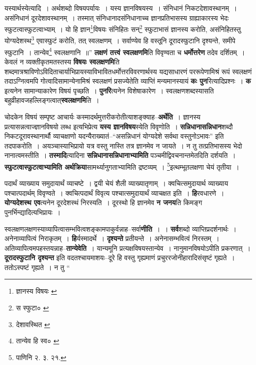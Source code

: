 \documentclass[article,12pt,a4paper]{memoir}
\begin{document}
	यस्यार्थस्येत्यादि । अर्थशब्दो विषयपर्यायः । यस्य ज्ञानविषयस्य । संनिधानं निकटदेशावस्थानम् । असंनिधानं दूरदेशावस्थानम् । तस्मात् संनिधानादसंनिधानाच्च ज्ञानप्रतिभासस्य ग्राह्याकारस्य भेदः स्फुटत्वास्फुटत्वाभ्याम् । यो हि ज्ञान\footnote{ज्ञानस्य विषयः \cite{dp-msA} \cite{dp-edP} \cite{dp-edH} \cite{dp-edE} \cite{dp-edN}}विषयः संनिहितः सन्\footnote{स स्फुटा० \cite{dp-msB} \cite{dp-msC} \cite{dp-msD}} स्फुटाभासं ज्ञानस्य करोति, असंनिहितस्तु योग्यदेशस्थ\footnote{देशावस्थित \cite{dp-msA} \cite{dp-msB} \cite{dp-msC} \cite{dp-edP} \cite{dp-edH} \cite{dp-edE} \cite{dp-edN}} एवास्फुटं करोति, तत् स्वलक्षणम् । सर्वाण्येव हि वस्तूनि दूरादस्फुटानि दृश्यन्ते, समीपे स्फुटानि । तान्येव\footnote{तान्येव हि स्व० \cite{dp-msC}} स्वलक्षणानि ॥” \textbf{लक्षणं तत्त्वं स्वलक्षणमि}ति विवृण्वता च \textbf{धर्मोत्तरेण} तदेव दर्शितम् । केवलं न व्यक्तीकृतमतस्तस्य \textbf{विषयः स्वलक्षणमि}ति शब्दमात्रश्राविणोऽविदिताचार्याभिप्रायस्याविभावितधर्मोत्तरविवरणार्थस्य यद्यसाधारणं पररूपेणामिश्रं रूपं स्वलक्षणं तदाऽग्नित्वमपि गोत्वादिसामान्येनामिश्रं स्वलक्षणं प्रसज्येतेति व्याप्तिं मन्यमानस्यायं \textbf{कः पुन}रित्यादिप्रश्नः । \textbf{क} इत्यनेन सामान्याकारेण विषयं पृच्छति । \textbf{पुनरि}त्यनेन विशेषाकारेण । स्वलक्षणशब्दस्यासति बहुव्रीहावजहल्लिङ्गत्वात्\textbf{स्वलक्षणमि}ति ।
	\pend
      

	  \pstart चोदकेन विषयं सम्पृष्ट आचार्यः कस्मादर्थमुत्तरीकरोतीत्याशङ्क्याह--\textbf{अर्थेति} । ज्ञानस्य प्रत्यासन्नत्वाज्ज्ञानविषयो लब्ध इत्यभिप्रेत्य \textbf{यस्य ज्ञानविषय}स्येति विवृणोति । \textbf{सन्निधानासन्निधान}शब्दौ निकटदूरावस्थानार्थौ व्याचक्षाणो यदन्यैराख्यातं--“असन्निधानं योग्यदेशे सर्वथा वस्तुनोऽभावः” इति तदपाकरोति । अयञ्चास्याभिप्रायो यत्र वस्तु नास्ति तत्र ज्ञानमेव न जायते । न तु तत्प्रतिभासस्य भेदो नानात्वमस्तीति । \textbf{तस्मादि}त्यादिना \textbf{स}\leavevmode{}\textbf{न्निधानासन्निधानाभ्यामिति} पञ्चमीद्विवचनान्तमेतदिति दर्शयति । \textbf{स्फुटत्वास्फुटत्वाभ्यामिति अर्थक्रिया}सामर्थ्यानुगताभ्यामिति द्रष्टव्यम् । \footnote{पाणिनि २. ३. २१.}इत्थम्भूतलक्षणा चेयं तृतीया ।
	\pend
      

	  \pstart पदार्थं व्याख्याय समुदायार्थं व्याचष्टे । द्वयी चेयं शैली व्याख्यातृणाम् । क्वचित्समुदायार्थ व्याख्याय पश्चात्पदार्थम् विवृण्वते । क्वचित्पदार्थं विवृत्य पश्चात्समुदायार्थं व्याचक्षत इति । \textbf{हि}रवधारणे । \textbf{योग्यदेशस्थ एव}त्यनेन दूरदेशस्थं निरस्यति । दूरस्थो हि ज्ञानमेव \textbf{न जनय}ति किमङ्ग पुनर्भिन्द्यादित्यभिप्रायः ।
	\pend
      

	  \pstart स्वलक्षणलक्षणस्याव्यापित्वासम्भवित्वशङ्कामपाकुर्वन्नाह--सर्वा\textbf{णीति} । । \textbf{सर्व}शब्दो व्याप्तिप्रदर्शनार्थः । अनेनाव्यापित्वं निराकृतम् । \textbf{हि}र्यस्मादर्थे । \textbf{दृश्यन्ते} प्रतीयन्ते । अनेनासम्भवित्वं निरस्तम् । अतिव्यापित्वमपहस्तयन्नाह--\textbf{तान्येवेति} । यान्यमूनि प्रत्यक्षविषयस्तान्येव । नानुमानविषयोऽपीति प्रकरणात् । \textbf{दूरादस्फुटानि दृश्यन्त} इति वदतश्चायमाशयः--दूरे हि वस्तु गृह्यमाणं प्रचुररजोनीहारादिसंसृष्टं गृह्यते । ततोऽस्पष्टं गृह्यते । न तु  \leavevmode{} “
	  
\end{document}
